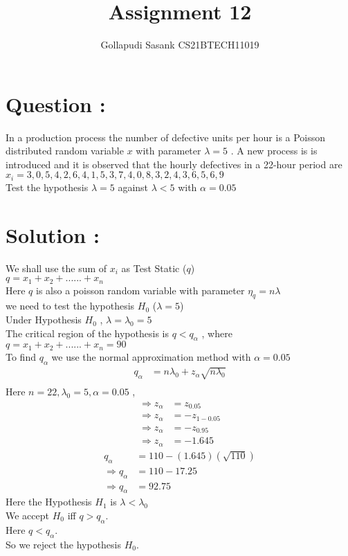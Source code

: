 \documentclass[journal,twocolumn,12pt]{IEEEtran}
\title{Assignment 12}
\author{Gollapudi Sasank CS21BTECH11019}
\begin{document}
\maketitle
\section*{Question : }
In a production process the number of defective units per hour is a Poisson distributed random variable $x$ with parameter $\lambda = 5$ . A new process is is introduced and it is observed that the hourly defectives in a 22-hour period are \\
$x_i = 3,0,5,4,2,6,4,1,5,3,7,4,0,8,3,2,4,3,6,5,6,9$ \\
Test the hypothesis $ \lambda = 5 $ against $ \lambda < 5$ with $ \alpha = 0.05 $
\section*{Solution : }
We shall use the sum of $x_i$ as Test Static ($q$) \\
$ q = x_1 + x_2 + ...... + x_n$ \\
Here $q$ is also a poisson random variable with parameter $\eta_q = n\lambda$ \\
we need to test the hypothesis  $H_0$ ($ \lambda = 5 $) \\
Under Hypothesis $H_0$ , $\lambda = \lambda_0 = 5$ \\
The critical region of the hypothesis is $q<q_\alpha$ , where \\
$ q = x_1 + x_2 + ...... + x_n = 90$ \\
To find $q_\alpha$ we use the normal approximation method with $\alpha = 0.05$ \\
\begin{align}
q_\alpha &= n\lambda_0 + z_\alpha \sqrt{n\lambda_0} \\
\end{align}
Here $ n=22,\lambda_0 = 5,\alpha = 0.05 $ ,
\begin{align}
\Rightarrow z_\alpha &= z_{0.05} \\
\Rightarrow z_\alpha &= -z_{1-0.05} \\
\Rightarrow z_\alpha &= -z_{0.95} \\
\Rightarrow z_\alpha &= -1.645
\end{align}
\begin{align}
q_\alpha &= 110 - (1.645)(\sqrt{110}) \\
\Rightarrow q_\alpha &= 110 - 17.25 \\
\Rightarrow q_\alpha &= 92.75
\end{align}
Here the Hypothesis $H_1$ is $\lambda < \lambda_0$ \\
We accept $H_0$ iff $q > q_\alpha$. \\
Here $ q < q_\alpha $. \\
So we reject the hypothesis $H_0$.
\end{document}
